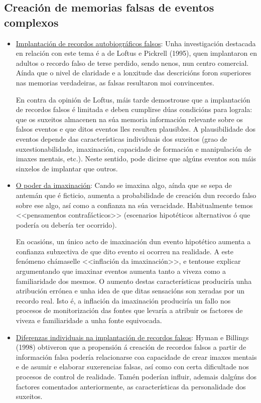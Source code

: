 \documentclass[a4paper,11pt]{article}
\begin{document}
\subsection{Creación de memorias falsas de eventos complexos}
\begin{itemize}
	\item \underline{Implantación de recordos autobiográficos falsos}: Unha investigación destacada
	en relación con este tema é a de Loftus e Pickrell (1995), quen implantaron en adultos o recordo
	falso de terse perdido, sendo nenos, nun centro comercial. Aínda que o nivel de claridade e a
	lonxitude das descricións foron superiores nas memorias verdadeiras, as falsas resultaron moi
	convincentes. 
	
	En contra da opinión de Loftus, máis tarde demostrouse que a implantación de recordos falsos é
	limitada e deben cumplirse dúas condicións para lograla: que os suxeitos almacenen na súa
	memoria información relevante sobre os falsos eventos e que ditos eventos lles resulten
	plausibles. A plausibilidade dos eventos depende das características individuais dos suxeitos
	(grao de suxestionabilidade, imaxinación, capacidade de formación e manipulación de imaxes
	mentais, etc.). Neste sentido, pode dicirse que algúns eventos son máis sinxelos de implantar
	que outros.
	\item \underline{O poder da imaxinación}: Cando se imaxina algo, aínda que se sepa de antemán
	que é ficticio, aumenta a probabilidade de creación dun recordo falso sobre ese algo, así como a
	confianza na súa veracidade. Habitualmente temos <<pensamentos contrafácticos>> (escenarios
	hipotéticos alternativos ó que podería ou debería ter ocorrido). 
	
	En ocasións, un único acto de imaxinación dun evento hipotético aumenta a confianza subxectiva
	de que dito evento si ocorreu na realidade. A este fenómeno chámaselle <<inflación da
	imaxinación>>, e tentouse explicar argumentando que imaxinar eventos aumenta tanto a viveza como
	a familiaridade dos mesmos. O aumento destas características produciría unha atribución errónea
	e unha idea de que ditas sensacións son xeradas por un recordo real. Isto é, a inflación da
	imaxinación produciría un fallo nos procesos de monitorización das fontes que levaría a atribuir
	os factores de viveza e familiaridade a unha fonte equivocada.
	\item \underline{Diferenzas individuais na implantación de recordos falsos}: Hyman e Billings
	(1998) obtiveron que a propensión á creación de recordos falsos a partir de información falsa
	podería relacionarse coa capacidade de crear imaxes mentais e de asumir e elaborar suxerencias
	falsas, así como con certa dificultade nos procesos de control de realidade. Tamén poderían
	influir, ademais dalgúns dos factores comentados anteriormente, as características da
	personalidade dos suxeitos.
\end{itemize}
\end{document}
